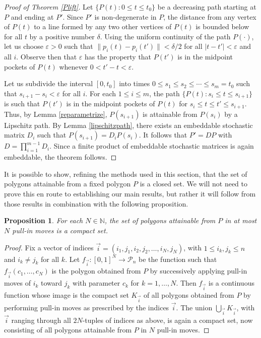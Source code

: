 \documentclass[11pt]{amsart}
\newtheorem{proposition}[theorem]{Proposition}
\theoremstyle{remark}
\numberwithin{equation}{section}
\newcommand{\N}{\mathbb{N}}
\newcommand{\PP}{\mathcal{P}}
\renewcommand{\epsilon}{\varepsilon}
\renewcommand{\leq}{\leqslant}
\begin{document}
\begin{proof}  [Proof of Theorem \ref{Plift}]
Let $\{P(t):0\leq t\leq t_0\}$ be a decreasing path starting at $P$ and ending at $P'$. Since $P'$ is non-degenerate in $P$, the distance from any vertex of $P(t)$ to a line formed by any two other vertices of $P(t)$ is bounded below for all $t$ by a positive number $\delta$. Using the uniform continuity of the path $P(\cdot)$, let us choose $\epsilon>0$ such that $\|p_{i}(t)-p_i(t')\|<\delta/2$ for all $|t-t'|<\epsilon$ and all $i$. 
Observe then that $\epsilon$ has the property that    $P(t')$ is in the midpoint pockets of $P(t)$ whenever  $0<t'-t<\epsilon$.

Let us subdivide the interval $[0,t_0]$ into times $0\leq s_1\leq s_2\leq\cdots\leq s_m=t_0$ such that $s_{i+1}-s_i<\epsilon$ for all $i$.
For each $1\leq i\leq m$, the path  $\{P(t):s_i\leq t\leq s_{i+1}\}$ is such that $P(t')$ is in the midpoint pockets of $P(t)$ for $s_i\leq t\leq t'\leq s_{i+1}$. Thus, by Lemma \ref{reparametrize}, $P(s_{i+1})$ is attainable from $P(s_i)$ by a Lipschitz path. By Lemma \ref{lipschitzpath}, 
there exists an embeddable stochastic matrix $D_i$ such that $P(s_{i+1})=D_iP(s_i)$. It follows that  $P'=D P$ with $D=\prod_{i=1}^{m-1} D_i$.  Since a finite product of embeddable stochastic matrices is again embeddable, the theorem  follows.
\end{proof}

It is possible to show, refining the methods used in this section, that the set of polygons attainable from a fixed polygon $P$ is a closed set.
We will not need to prove this en route to establishing our main results, but rather it will follow from those results in combination with the following
proposition. 

\begin{proposition}\label{compactNmoves}
For each $N\in \N$, the set of polygons attainable from $P$ in at most $N$ pull-in moves is a compact set.
\end{proposition}

\begin{proof}
Fix a vector of indices $\vec i=(i_1,j_1,i_2,j_2,\ldots,i_N,j_N)$, with $1\leq i_k,j_k\leq n$ and $i_k\neq j_k$ for all $k$.
Let $f_{\vec i}\colon [0,1]^N\to \PP_n$ be the function such that $f_{\vec i}(c_1,\ldots,c_N)$ is the polygon obtained from $P$
by successively applying pull-in moves of  $i_k$ toward $j_k$ with parameter $c_k$ for $k=1,\ldots,N$. Then $f_{\vec i}$ is a continuous function whose image is the compact set $K_{\vec i}$ of all polygons obtained from $P$ by performing pull-in moves as prescribed by the indices $\vec i$. The union $\bigcup_{\vec i} K_{\vec i}$, with $\vec i$ ranging through all $2N$-tuples of indices as above, is again a compact set, now  consisting of all polygons attainable from $P$ in $N$ pull-in moves.
\end{proof}
\end{document}
